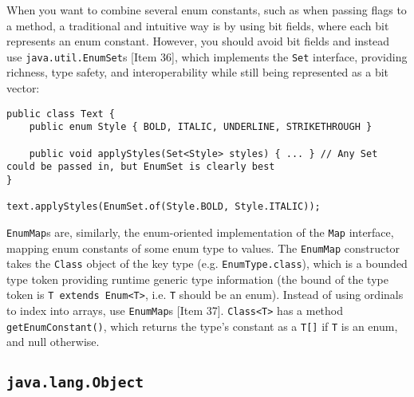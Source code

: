 \documentclass[8pt, table, xcdraw]{article}%
\begin{document}
When you want to combine several enum constants, such as when passing flags to a method, a traditional and intuitive way is by using bit fields, where each bit represents an enum constant. However, you should avoid bit fields and instead use \lstinline{java.util.EnumSet}s [Item 36], which implements the \lstinline{Set} interface, providing richness, type safety, and interoperability while still being represented as a bit vector:

\begin{lstlisting}
public class Text {
    public enum Style { BOLD, ITALIC, UNDERLINE, STRIKETHROUGH }

    public void applyStyles(Set<Style> styles) { ... } // Any Set could be passed in, but EnumSet is clearly best
}

text.applyStyles(EnumSet.of(Style.BOLD, Style.ITALIC));
\end{lstlisting}

\lstinline{EnumMap}s are, similarly, the enum-oriented implementation of the \lstinline{Map} interface, mapping enum constants of some enum type to values. The \lstinline{EnumMap} constructor takes the \lstinline{Class} object of the key type (e.g. \lstinline{EnumType.class}), which is a bounded type token providing runtime generic type information (the bound of the type token is \lstinline{T extends Enum<T>}, i.e. \lstinline{T} should be an enum). Instead of using ordinals to index into arrays, use \lstinline{EnumMap}s [Item 37]. \lstinline{Class<T>} has a method \lstinline{getEnumConstant()}, which returns the type's constant as a \lstinline{T[]} if \lstinline{T} is an enum, and null otherwise.

\subsection{\lstinline{java.lang.Object}}
\end{document}
